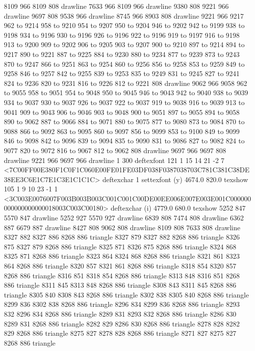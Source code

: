 8109 966 8109 808 drawline
7633 966 8109 966 drawline
9380 808 9221 966 drawline
9697 808 9538 966 drawline
8745 966 8903 808 drawline
9221 966 9217 962 to 9214 958 to 9210 954 to 9207 950 to 9204 946 to 9202 942 to 9199 938 to 9198 934 to 9196 930 to 9196 926 to 9196 922 to 9196 919 to 9197 916 to 9198 913 to 9200 909 to 9202 906 to 9205 903 to 9207 900 to 9210 897 to 9214 894 to 9217 890 to 9221 887 to 9225 884 to 9230 880 to 9234 877 to 9239 873 to 9243 870 to 9247 866 to 9251 863 to 9254 860 to 9256 856 to 9258 853 to 9259 849 to 9258 846 to 9257 842 to 9255 839 to 9253 835 to 9249 831 to 9245 827 to 9241 824 to 9236 820 to 9231 816 to 9226 812 to 9221 808 drawline
9062 966 9058 962 to 9055 958 to 9051 954 to 9048 950 to 9045 946 to 9043 942 to 9040 938 to 9039 934 to 9037 930 to 9037 926 to 9037 922 to 9037 919 to 9038 916 to 9039 913 to 9041 909 to 9043 906 to 9046 903 to 9048 900 to 9051 897 to 9055 894 to 9058 890 to 9062 887 to 9066 884 to 9071 880 to 9075 877 to 9080 873 to 9084 870 to 9088 866 to 9092 863 to 9095 860 to 9097 856 to 9099 853 to 9100 849 to 9099 846 to 9098 842 to 9096 839 to 9094 835 to 9090 831 to 9086 827 to 9082 824 to 9077 820 to 9072 816 to 9067 812 to 9062 808 drawline
9697 966 9697 808 drawline
9221 966 9697 966 drawline
1 300 deftexfont
121 1 15 14 21 -2 7 {{<7C00FF00E380F1C0F1C060E00FE01FE03DF038F0387038703C781C381C38DE38EE3C6E1C7E1C3E1C1C1C>}} deftexchar
1 settexfont
(y) 4674.0 820.0 texshow
105 1 9 10 23 -1 1 {{<3C003E0076007F003B003B003C001C001C00DE00EE006E007E003E001C000000000000000000018003C003C00180>}} deftexchar
(i) 4779.0 680.0 texshow
5252 847 5570 847 drawline
5252 927 5570 927 drawline
6839 808 7474 808 drawline
6362 887 6679 887 drawline
8427 808 9062 808 drawline
8109 808 7633 808 drawline
8327 882 8327 886 8268 886 triangle
8327 879 8327 882 8268 886 triangle
8326 875 8327 879 8268 886 triangle
8325 871 8326 875 8268 886 triangle
8324 868 8325 871 8268 886 triangle
8323 864 8324 868 8268 886 triangle
8321 861 8323 864 8268 886 triangle
8320 857 8321 861 8268 886 triangle
8318 854 8320 857 8268 886 triangle
8316 851 8318 854 8268 886 triangle
8313 848 8316 851 8268 886 triangle
8311 845 8313 848 8268 886 triangle
8308 843 8311 845 8268 886 triangle
8305 840 8308 843 8268 886 triangle
8302 838 8305 840 8268 886 triangle
8299 836 8302 838 8268 886 triangle
8296 834 8299 836 8268 886 triangle
8293 832 8296 834 8268 886 triangle
8289 831 8293 832 8268 886 triangle
8286 830 8289 831 8268 886 triangle
8282 829 8286 830 8268 886 triangle
8278 828 8282 829 8268 886 triangle
8275 827 8278 828 8268 886 triangle
8271 827 8275 827 8268 886 triangle
